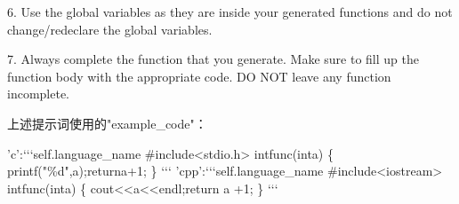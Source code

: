 6. Use the global variables as they are inside your generated functions and do not change/redeclare the global variables.

7. Always complete the function that you generate. Make sure to fill up the function body with the appropriate code. DO NOT leave any function incomplete.

上述提示词使用的"example\_code"：

’c’:‘‘‘self.language\_name
 \#include<stdio.h>
 intfunc(inta) \{ printf("\%d",a);returna+1; \}
‘‘‘
’cpp’:‘‘‘self.language\_name
 \#include<iostream>
 intfunc(inta) \{ cout<<a<<endl;return a +1; \}
‘‘‘